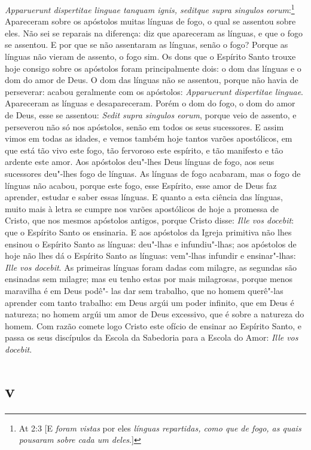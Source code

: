 \emph{Apparuerunt dispertitae linguae tanquam ignis, seditque supra
singulos eorum}:\footnote{At 2:3 [E \emph{foram vistas} por eles \emph{línguas repartidas, como que de fogo, as quais pousaram sobre cada um deles}.]} Apareceram sobre os apóstolos muitas línguas de fogo, o qual se assentou sobre eles. Não sei se reparais na
diferença: diz que apareceram as línguas, e que o fogo se assentou. E
por que se não assentaram as línguas, senão o fogo? Porque as línguas
não vieram de assento, o fogo sim. Os dons que o Espírito Santo trouxe
hoje consigo sobre os apóstolos foram principalmente dois: o dom das
línguas e o dom do amor de Deus. O dom das línguas não se assentou,
porque não havia de perseverar: acabou geralmente com os apóstolos:
\emph{Apparuerunt dispertitae linguae}. Apareceram as línguas e
desapareceram. Porém o dom do fogo, o dom do amor de Deus, esse se
assentou: \emph{Sedit supra singulos eorum}, porque veio de assento, e
perseverou não só nos apóstolos, senão em todos os seus sucessores. E
assim vimos em todas as idades, e vemos também hoje tantos varões
apostólicos, em que está tão vivo este fogo, tão fervoroso este
espírito, e tão manifesto e tão ardente este amor. Aos apóstolos
deu"-lhes Deus línguas de fogo, aos seus sucessores deu"-lhes fogo de
línguas. As línguas de fogo acabaram, mas o fogo de línguas não acabou,
porque este fogo, esse Espírito, esse amor de Deus faz aprender, estudar
e saber essas línguas. E quanto a esta ciência das línguas, muito mais à
letra se cumpre nos varões apostólicos de hoje a promessa de Cristo, que
nos mesmos apóstolos antigos, porque Cristo disse: \emph{Ille vos
docebit}: que o Espírito Santo os ensinaria. E aos apóstolos da Igreja
primitiva não lhes ensinou o Espírito Santo as línguas: deu"-lhas e
infundiu"-lhas; aos apóstolos de hoje não lhes dá o Espírito Santo as
línguas: vem"-lhas infundir e ensinar"-lhas: \emph{Ille vos docebit}. As
primeiras
línguas foram dadas com milagre, as segundas são ensinadas sem milagre;
mas eu tenho estas por mais milagrosas, porque menos maravilha é em Deus
podê"- las dar sem trabalho, que no homem querê"-las aprender com tanto
trabalho: em Deus argúi um poder infinito, que em Deus é natureza; no
homem argúi um amor de Deus excessivo, que é sobre a natureza do homem.
Com razão comete logo Cristo este ofício de ensinar ao Espírito Santo, e
passa os seus discípulos da Escola da Sabedoria para a Escola do Amor:
\emph{Ille vos docebit}.

\section*{v}

